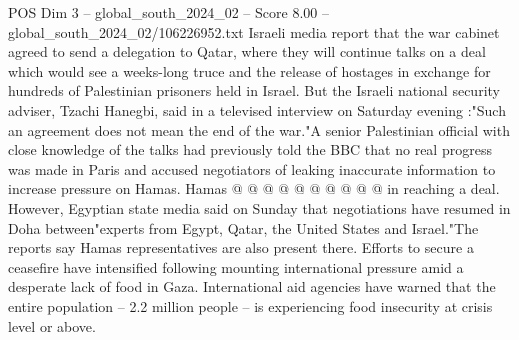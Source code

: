 \begin{textsample}{POS Dim 3 – global\_south\_2024\_02 – Score 8.00 – global\_south\_2024\_02/106226952.txt}
Israeli media report that the war cabinet agreed to send a delegation to Qatar, where they will continue talks on a deal which would see a weeks-long truce and the release of hostages in exchange for hundreds of Palestinian prisoners held in Israel.
But the Israeli national security adviser, Tzachi Hanegbi, said in a televised interview on Saturday evening :"Such an agreement does not mean the end of the war."A senior Palestinian official with close knowledge of the talks had previously told the BBC that no real progress was made in Paris and accused negotiators of leaking inaccurate information to increase pressure on Hamas.
Hamas @ @ @ @ @ @ @ @ @ @ in reaching a deal.
However, Egyptian state media said on Sunday that negotiations have resumed in Doha between"experts from Egypt, Qatar, the United States and Israel."The reports say Hamas representatives are also present there.
Efforts to secure a ceasefire have intensified following mounting international pressure amid a desperate lack of food in Gaza.
International aid agencies have warned that the entire population -- 2.2 million people -- is experiencing food insecurity at crisis level or above.

\end{textsample}
